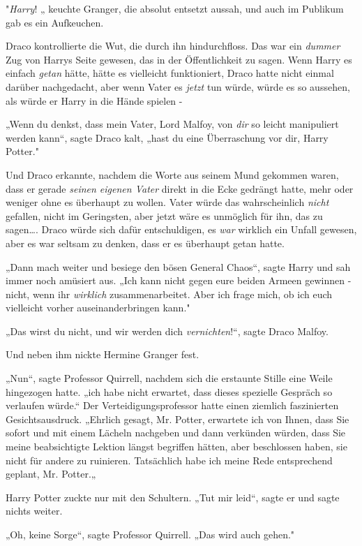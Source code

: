 {"\emph{Harry}! „ keuchte Granger, die absolut entsetzt aussah, und auch im Publikum gab es ein Aufkeuchen.

Draco kontrollierte die Wut, die durch ihn hindurchfloss. Das war ein \emph{dummer} Zug von Harrys Seite gewesen, das in der Öffentlichkeit zu sagen. Wenn Harry es einfach \emph{getan} hätte, hätte es vielleicht funktioniert, Draco hatte nicht einmal darüber nachgedacht, aber wenn Vater es \emph{jetzt} tun würde, würde es so aussehen, als würde er Harry in die Hände spielen -

„Wenn du denkst, dass mein Vater, Lord Malfoy, von \emph{dir} so leicht manipuliert werden kann“, sagte Draco kalt, „hast du eine Überraschung vor dir, Harry Potter."

Und Draco erkannte, nachdem die Worte aus seinem Mund gekommen waren, dass er gerade \emph{seinen eigenen Vater} direkt in die Ecke gedrängt hatte, mehr oder weniger ohne es überhaupt zu wollen. Vater würde das wahrscheinlich \emph{nicht} gefallen, nicht im Geringsten, aber jetzt wäre es unmöglich für ihn, das zu sagen…. Draco würde sich dafür entschuldigen, es \emph{war} wirklich ein Unfall gewesen, aber es war seltsam zu denken, dass er es überhaupt getan hatte.

„Dann mach weiter und besiege den bösen General Chaos“, sagte Harry und sah immer noch amüsiert aus. „Ich kann nicht gegen eure beiden Armeen gewinnen - nicht, wenn ihr \emph{wirklich} zusammenarbeitet. Aber ich frage mich, ob ich euch vielleicht vorher auseinanderbringen kann."

„Das wirst du nicht, und wir werden dich \emph{vernichten}!“, sagte Draco Malfoy.

Und neben ihm nickte Hermine Granger fest.

„Nun“, sagte Professor Quirrell, nachdem sich die erstaunte Stille eine Weile hingezogen hatte. „ich habe nicht erwartet, dass dieses spezielle Gespräch so verlaufen würde.“ Der Verteidigungsprofessor hatte einen ziemlich faszinierten Gesichtsausdruck. „Ehrlich gesagt, Mr. Potter, erwartete ich von Ihnen, dass Sie sofort und mit einem Lächeln nachgeben und dann verkünden würden, dass Sie meine beabsichtigte Lektion längst begriffen hätten, aber beschlossen haben, sie nicht für andere zu ruinieren. Tatsächlich habe ich meine Rede entsprechend geplant, Mr. Potter.„

Harry Potter zuckte nur mit den Schultern. „Tut mir leid“, sagte er und sagte nichts weiter.

„Oh, keine Sorge“, sagte Professor Quirrell. „Das wird auch gehen."

}

